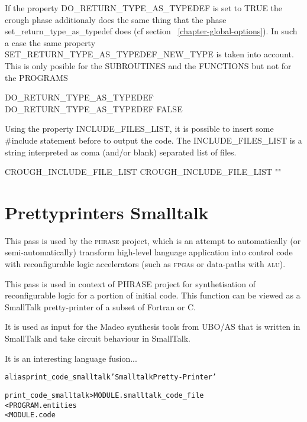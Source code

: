 \documentclass[a4paper]{report}
\newenvironment{PipsMake}{\begin{alltt}}{\end{alltt}}
\newenvironment{PipsPass}[1]{\label{pass:#1}}{}
\begin{document}
If the property DO\_RETURN\_TYPE\_AS\_TYPEDEF is set to TRUE the crough
phase  additionaly does the same thing that the phase
set\_return\_type\_as\_typedef does (cf section ~\ref{chapter-global-options}).
In such a case the same property SET\_RETURN\_TYPE\_AS\_TYPEDEF\_NEW\_TYPE is
taken into account. This is only posible for the SUBROUTINES and the FUNCTIONS
but not for the PROGRAMS

\begin{PipsProp}{DO_RETURN_TYPE_AS_TYPEDEF}
DO_RETURN_TYPE_AS_TYPEDEF FALSE
\end{PipsProp}

Using the property INCLUDE\_FILES\_LIST, it is possible to insert some
\#include statement before to output the code. The INCLUDE\_FILES\_LIST
is a string interpreted as coma (and/or blank) separated list of files.

\begin{PipsProp}{CROUGH_INCLUDE_FILE_LIST}
CROUGH_INCLUDE_FILE_LIST ""
\end{PipsProp}

\section{Prettyprinters Smalltalk}
\label{subsection-prettyprinters-smalltalk}

This pass is used by the \textsc{phrase} project, which is an attempt to
automatically (or semi-automatically) transform high-level language
application into control code with reconfigurable logic accelerators (such
as \textsc{fpga}s or data-paths with \textsc{alu}).

\begin{PipsPass}{print_code_smalltalk}
This pass is used in context of PHRASE project for synthetisation of
reconfigurable logic for a portion of initial code. This function can
be viewed as a SmallTalk pretty-printer of a subset of Fortran or C.

It is used as input for the Madeo synthesis tools from UBO/AS that is
written in SmallTalk and take circuit behaviour in SmallTalk.
\end{PipsPass}

It is an interesting language fusion...

\begin{PipsMake}
alias print_code_smalltalk 'Smalltalk Pretty-Printer'

print_code_smalltalk        > MODULE.smalltalk_code_file
        < PROGRAM.entities
        < MODULE.code
\end{PipsMake}
\end{document}
